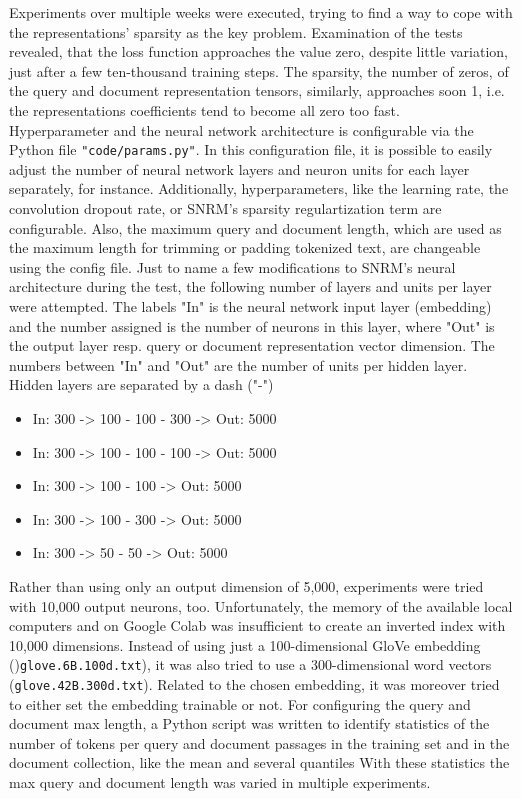 Experiments over multiple weeks were executed, trying to find a way to cope with the representations' sparsity 
    as the key problem.
Examination of the tests revealed, that the loss function approaches the value zero, 
    despite little variation, just after a few ten-thousand training steps.
The sparsity, the number of zeros, of the query and document representation tensors, similarly, 
    approaches soon 1, i.e. the representations coefficients tend to become all zero too fast.\\
Hyperparameter and the neural network architecture is configurable via the Python file \verb|"code/params.py"|.
In this configuration file, it is possible to easily adjust the number of neural network layers and neuron units
    for each layer separately, for instance.
Additionally, hyperparameters, like the learning rate, the convolution dropout rate, or SNRM's sparsity regulartization term
    are configurable.
Also, the maximum query and document length, which are used as the maximum length for trimming or padding tokenized text,
    are changeable using the config file.
Just to name a few modifications to SNRM's neural architecture during the test, the following number of layers and units per layer
    were attempted.
The labels "In" is the neural network input layer (embedding) and the number assigned is the number of neurons in this layer, 
    where "Out" is the output layer resp. query or document representation vector dimension.
The numbers between "In" and "Out" are the number of units per hidden layer. 
Hidden layers are separated by a dash ("-")
\begin{itemize}
    \item In: 300 -> 100 - 100 - 300 -> Out: 5000
    \item In: 300 -> 100 - 100 - 100 -> Out: 5000
    \item In: 300 -> 100 - 100 -> Out: 5000
    \item In: 300 -> 100 - 300 -> Out: 5000
    \item In: 300 -> 50 - 50 -> Out: 5000
\end{itemize}

Rather than using only an output dimension of 5,000, experiments were tried with 10,000 output neurons, too.
Unfortunately, the memory of the available local computers and on Google Colab was insufficient to create an inverted index
    with 10,000 dimensions.
Instead of using just a 100-dimensional GloVe embedding ()\verb|glove.6B.100d.txt|), it was also tried to 
    use a 300-dimensional word vectors (\verb|glove.42B.300d.txt|).
Related to the chosen embedding, it was moreover tried to either set the embedding trainable or not.
For configuring the query and document max length, a Python script was written to identify statistics of the 
    number of tokens per query and document passages in the training set and in the document collection, 
    like the mean and several quantiles
With these statistics the max query and document length was varied in multiple experiments.

